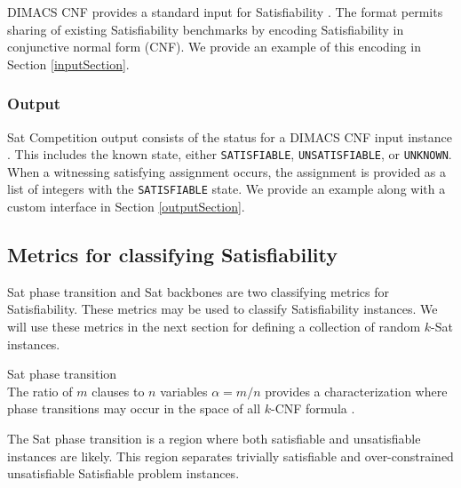 DIMACS CNF provides a standard input for {\sc Satisfiability} \cite{dimacsFormat}.  The format permits sharing of existing {\sc Satisfiability} benchmarks by encoding {\sc Satisfiability} in conjunctive normal form (CNF).  We provide an example of this encoding in Section \ref{inputSection}.
		
		\subsubsection{Output}
		

{\sc Sat} Competition output consists of the status for a DIMACS CNF input instance \cite{satcompetition}.  This includes the known state, either \texttt{SATISFIABLE}, \texttt{UNSATISFIABLE}, or \texttt{UNKNOWN}.  When a witnessing satisfying assignment occurs, the assignment is provided as a list of integers with the \texttt{SATISFIABLE} state.  We provide an example along with a custom interface in Section \ref{outputSection}.
	
	\subsection{Metrics for classifying {\sc Satisfiability}}

{\sc Sat} phase transition and {\sc Sat} backbones are two classifying metrics for {\sc Satisfiability}.  These metrics may be used to classify {\sc Satisfiability} instances.  We will use these metrics in the next section for defining a collection of random $k$-{\sc Sat} instances.
		

\begin{definition}
{\sc Sat} phase transition\\
The ratio of $m$ clauses to $n$ variables $\alpha = m/n$ provides a characterization where phase transitions may occur in the space of all $k$-CNF formula \cite{Doherty08thehandbook,Gent94thesat}.
\end{definition}

The {\sc Sat} phase transition is a region where both satisfiable and unsatisfiable instances are likely.  This region separates trivially satisfiable and over-constrained unsatisfiable {\sc Satisfiable} problem instances.  
		
